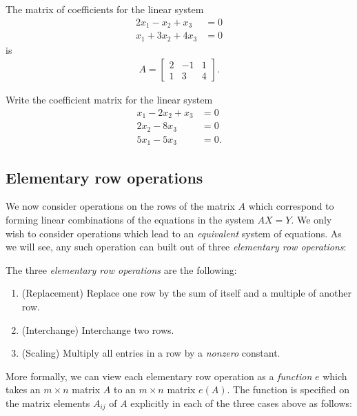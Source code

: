 \documentclass[12pt,letterpaper,reqno]{article}
\numberwithin{equation}{section}
\newcommand{\ti}[1]{\textit{#1}}
\begin{document}
\begin{example}
	The matrix of coefficients for the linear system
		\begin{align*}
		2x_1-x_2+x_3&=0 \\
		x_1+3x_2+4x_3&=0
	\end{align*} 
is
\begin{align*}
	A=\begin{bmatrix}
		2&-1&1 \\ 1&3&4
	\end{bmatrix}.
\end{align*}	
\end{example}

\begin{exercise}
	Write the coefficient matrix for the linear system
\begin{align*}
		x_1-2x_2+x_3&=0 \\
		2x_2-8x_3 &=0 \\
		5x_1-5x_3 &=0.
	\end{align*}
\end{exercise}

\subsection{Elementary row operations}
We now consider operations on the rows of the matrix $A$ which correspond to forming linear combinations of the equations in the system $AX=Y$. 
	We only wish to consider operations which lead to an \ti{equivalent} system of equations.
	As we will see, any such operation can built out of three \ti{elementary row operations}:
\begin{defn} \label{def:elementary_row_operations}
The three \ti{elementary row operations} are the following:
\begin{enumerate}
	\item (Replacement) Replace one row by the sum of itself and a multiple of another row.
	\item (Interchange) Interchange two rows.
	\item (Scaling) Multiply all entries in a row by a \emph{nonzero} constant.
\end{enumerate}	
\end{defn}

More formally, we can view each elementary row operation as a \emph{function} $e$ which takes an $m \times n$ matrix $A$ to an $m \times n$ matrix $e(A)$. The function is specified on the matrix elements $A_{ij}$ of $A$ explicitly in each of the three cases above as follows:
\end{document}
